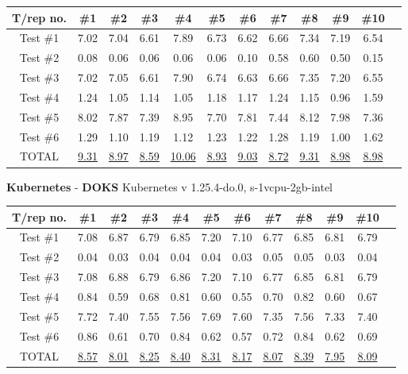 \begin{tabular}{ |c|c|c|c|c|c|c|c|c|c|c|c| } 
    \hline
    T/rep no. & \#1 & \#2& \#3& \#4& \#5& \#6& \#7& \#8& \#9& \#10 \\
    \hline
    Test \#1 & 7.02 & 7.04& 6.61& 7.89& 6.73& 6.62& 6.66& 7.34& 7.19& 6.54 \\ 
    Test \#2 & 0.08 & 0.06& 0.06& 0.06& 0.06& 0.10& 0.58& 0.60& 0.50& 0.15 \\ 
    Test \#3 & 7.02 & 7.05& 6.61& 7.90& 6.74& 6.63& 6.66& 7.35& 7.20& 6.55 \\ 
    Test \#4 & 1.24 & 1.05& 1.14& 1.05& 1.18& 1.17& 1.24& 1.15& 0.96& 1.59 \\ 
    Test \#5 & 8.02 & 7.87& 7.39& 8.95& 7.70& 7.81& 7.44& 8.12& 7.98& 7.36 \\ 
    Test \#6 & 1.29 & 1.10& 1.19& 1.12& 1.23& 1.22& 1.28& 1.19& 1.00& 1.62 \\ 
    TOTAL & \underline{9.31} & \underline{8.97}& \underline{8.59}&\underline{10.06}& \underline{8.93}& \underline{9.03}& \underline{8.72}& \underline{9.31}& \underline{8.98}& \underline{8.98} \\ 
    \hline
\end{tabular}
\newline
\textbf{Kubernetes} - \textbf{DOKS} Kubernetes v 1.25.4-do.0, s-1vcpu-2gb-intel
\newline
\begin{tabular}{ |c|c|c|c|c|c|c|c|c|c|c|c| } 
    \hline
    T/rep no. & \#1 & \#2& \#3& \#4& \#5& \#6& \#7& \#8& \#9& \#10 \\
    \hline
    Test \#1 & 7.08 & 6.87& 6.79& 6.85& 7.20& 7.10& 6.77& 6.85& 6.81& 6.79 \\ 
    Test \#2 & 0.04 & 0.03& 0.04& 0.04& 0.04& 0.03& 0.05& 0.05& 0.03& 0.04 \\ 
    Test \#3 & 7.08 & 6.88& 6.79& 6.86& 7.20& 7.10& 6.77& 6.85& 6.81& 6.79 \\ 
    Test \#4 & 0.84 & 0.59& 0.68& 0.81& 0.60& 0.55& 0.70& 0.82& 0.60& 0.67 \\ 
    Test \#5 & 7.72 & 7.40& 7.55& 7.56& 7.69& 7.60& 7.35& 7.56& 7.33& 7.40 \\ 
    Test \#6 & 0.86 & 0.61& 0.70& 0.84& 0.62& 0.57& 0.72& 0.84& 0.62& 0.69 \\ 
    TOTAL & \underline{8.57} & \underline{8.01}& \underline{8.25}& \underline{8.40}& \underline{8.31}& \underline{8.17}& \underline{8.07}& \underline{8.39}& \underline{7.95}& \underline{8.09} \\ 
    \hline
\end{tabular}
